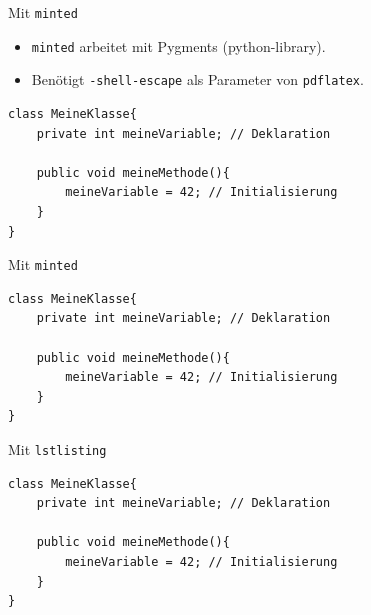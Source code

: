 \documentclass{beamer}
\begin{document}

		\begin{frame}[containsverbatim]{Mit \texttt{minted}}
			\begin{itemize}
				\item \texttt{minted} arbeitet mit Pygments (python-library).
				\item Benötigt \texttt{-shell-escape} als Parameter von \texttt{pdflatex}.
			\end{itemize}

			\begin{smalllatexcode}
\usepackage{minted}
\begin{verbatim}
class MeineKlasse{
	private int meineVariable; // Deklaration

	public void meineMethode(){
		meineVariable = 42; // Initialisierung
	}
}
\end{verbatim}
			\end{smalllatexcode}
		\end{frame}


		\begin{frame}[containsverbatim]{Mit \texttt{minted}}
			\begin{verbatim}
class MeineKlasse{
	private int meineVariable; // Deklaration

	public void meineMethode(){
		meineVariable = 42; // Initialisierung
	}
}
			\end{verbatim}
		\end{frame}


		\begin{frame}[containsverbatim]{Mit \texttt{lstlisting}}
			\begin{smallerlatexcode}
\usepackage{listings}
\lstset{...} %
\begin{lstlisting}[caption=Deklaration und Initialisierung von Variablen]
class MeineKlasse{
	private int meineVariable; // Deklaration

	public void meineMethode(){
		meineVariable = 42; // Initialisierung
	}
}
\end{lstlisting}
			\end{smallerlatexcode}
		\end{frame}
\end{document}
